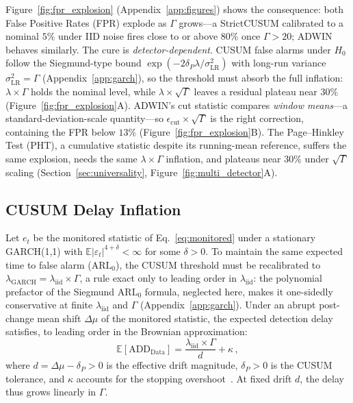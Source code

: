 \documentclass[sigconf,anonymous,review]{acmart}
\theoremstyle{acmdefinition}
\begin{document}
Figure~\ref{fig:fpr_explosion} (Appendix~\ref{app:figures}) shows the consequence: both False Positive Rates (FPR) explode as $\Gamma$ grows---a StrictCUSUM calibrated to a nominal $5\%$ under IID noise fires close to or above $80\%$ once $\Gamma > 20$; ADWIN behaves similarly. The cure is \emph{detector-dependent}. CUSUM false alarms under $H_0$ follow the Siegmund-type bound $\exp(-2\delta_P\lambda/\sigma^2_{\mathrm{LR}})$ with long-run variance $\sigma^2_{\mathrm{LR}} = \Gamma$ (Appendix~\ref{app:garch}), so the threshold must absorb the full inflation: $\lambda \times \Gamma$ holds the nominal level, while $\lambda \times \sqrt{\Gamma}$ leaves a residual plateau near $30\%$ (Figure~\ref{fig:fpr_explosion}A). ADWIN's cut statistic compares \emph{window means}---a standard-deviation-scale quantity---so $\epsilon_{\mathrm{cut}} \times \sqrt{\Gamma}$ is the right correction, containing the FPR below $13\%$ (Figure~\ref{fig:fpr_explosion}B). The Page--Hinkley Test (PHT), a cumulative statistic despite its running-mean reference, suffers the same explosion, needs the same $\lambda \times \Gamma$ inflation, and plateaus near $30\%$ under $\sqrt{\Gamma}$ scaling (Section~\ref{sec:universality}, Figure~\ref{fig:multi_detector}A).

\subsection{CUSUM Delay Inflation}

\begin{proposition}\label{prop:add_garch}
    Let $e_t$ be the monitored statistic of Eq.~\eqref{eq:monitored} under a stationary GARCH(1,1) with $\mathbb{E}|\varepsilon_t|^{4+\delta} < \infty$ for some $\delta > 0$.
    To maintain the same expected time to false alarm ($\mathrm{ARL}_0$), the CUSUM threshold must be recalibrated to $\lambda_{\mathrm{GARCH}} = \lambda_{\mathrm{iid}} \times \Gamma$, a rule exact only to leading order in $\lambda_{\mathrm{iid}}$: the polynomial prefactor of the Siegmund $\mathrm{ARL}_0$ formula, neglected here, makes it one-sidedly conservative at finite $\lambda_{\mathrm{iid}}$ and $\Gamma$ (Appendix~\ref{app:garch}).
    Under an abrupt post-change mean shift $\Delta\mu$ of the monitored statistic, the expected detection delay satisfies, to leading order in the Brownian approximation:
    \begin{equation}\label{eq:add_garch}
        \mathbb{E}[\mathrm{ADD}_{\mathrm{Data}}] = \frac{\lambda_{\mathrm{iid}} \times \Gamma}{d} + \kappa\,,
    \end{equation}
    where $d = \Delta\mu - \delta_P > 0$ is the effective drift magnitude, $\delta_P > 0$ is the CUSUM tolerance, and $\kappa$ accounts for the stopping overshoot~\cite{siegmund_1985}. At fixed drift $d$, the delay thus grows linearly in $\Gamma$.
\end{proposition}
\end{document}
